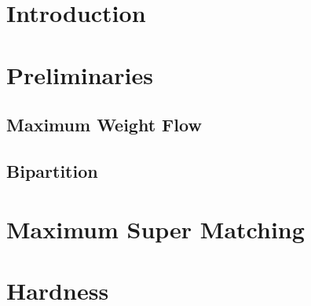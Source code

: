 \begin{abstract}

\end{abstract}

\section{Introduction}


\section{Preliminaries}
	\subsection{Maximum Weight Flow}
	
	\subsection{Bipartition}
	

\section{\FIXEDCARPOOL{}}


\section{\UWCARPOOL{}}


\section{\UCCARPOOL{}}


\section{Maximum Super Matching}


\section{\CARPOOL{}}


\section{Hardness}


% 